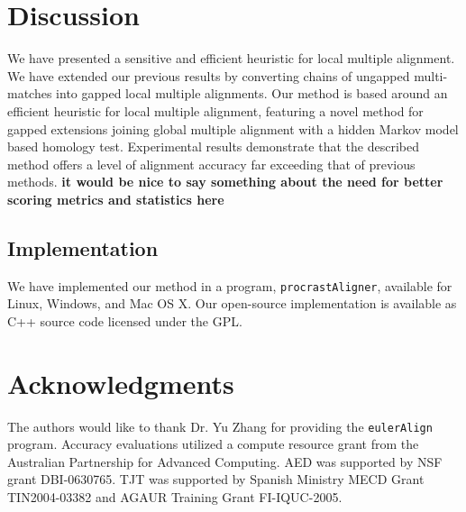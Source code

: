 \documentclass{ws-procs975x65}
\begin{document}
\section{Discussion}

We have presented a sensitive and efficient heuristic for local multiple alignment. We have extended our previous results by converting chains of ungapped multi-matches into gapped local multiple alignments. Our method is based around an efficient heuristic for local multiple alignment, featuring a novel method for gapped extensions joining global multiple alignment with a hidden Markov model based homology test.  Experimental results demonstrate that the described method offers a level of alignment accuracy far exceeding that of previous methods.
\textbf{it would be nice to say something about the need for better scoring metrics and statistics here}

\subsection{Implementation}
We have implemented our method in a program, \texttt{procrastAligner}, available for Linux, Windows, and Mac OS X. Our open-source implementation is available as C++ source code licensed under the GPL.

\section{ Acknowledgments }
The authors would like to thank Dr. Yu Zhang for providing the \texttt{eulerAlign} program.
Accuracy evaluations utilized a compute resource grant from the Australian Partnership for Advanced Computing.  AED was supported by NSF grant DBI-0630765. TJT was
supported by Spanish Ministry MECD Grant TIN2004-03382 and AGAUR
Training Grant FI-IQUC-2005.




\end{document}
